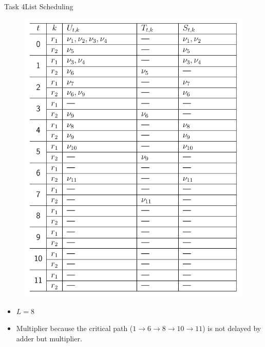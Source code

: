 \begin{frame}[allowframebreaks]{Task 4}{List Scheduling}
\begin{solution}
\begin{figure}
      \includegraphics[height=0.5\paperheight]{./figures/task4_schedule.png}
    \end{figure}
  \end{solution}
  \framebreak
  \begin{solution}
    \begin{itemize}
      \item $L=8$
    \end{itemize}
  \end{solution}
  \framebreak
  \begin{solutionnoinc}
    \begin{itemize}
      \item Multiplier because the critical path ($1 \rightarrow 6 \rightarrow 8 \rightarrow 10 \rightarrow 11$) is not delayed by adder but multiplier.
    \end{itemize}
  \end{solutionnoinc}
  \framebreak
  \begin{solutionnoinc}
    \centering
    \tiny
    \begin{tabular}{c|c|l|l|l|}

\end{tabular}
\end{solutionnoinc}
\end{frame}
